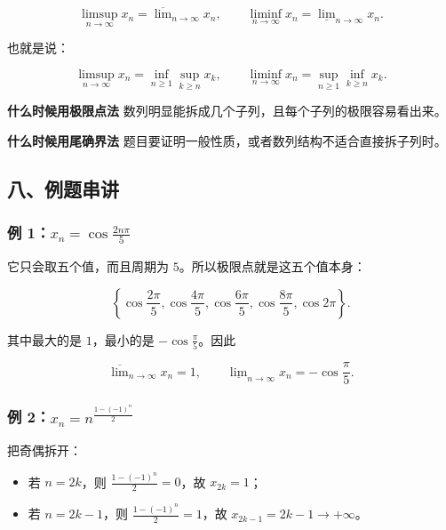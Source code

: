 \[
      \limsup_{n\to\infty}x_n=\overline{\lim}_{n\to\infty}x_n,
      \qquad
      \liminf_{n\to\infty}x_n=\underline{\lim}_{n\to\infty}x_n.
    \]

也就是说：

\[
      \limsup_{n\to\infty}x_n
      =
      \inf_{n\ge1}\sup_{k\ge n}x_k,
      \qquad
      \liminf_{n\to\infty}x_n
      =
      \sup_{n\ge1}\inf_{k\ge n}x_k.
    \]

\begin{conceptbox}
\textbf{什么时候用极限点法}
数列明显能拆成几个子列，且每个子列的极限容易看出来。
\end{conceptbox}

\begin{conceptbox}
\textbf{什么时候用尾确界法}
题目要证明一般性质，或者数列结构不适合直接拆子列时。
\end{conceptbox}

\subsection*{八、例题串讲}

\subsubsection*{例 1：\(\displaystyle x_n=\cos\frac{2n\pi}{5}\)}

它只会取五个值，而且周期为 \(5\)。所以极限点就是这五个值本身：

\[
      \left\{\cos\frac{2\pi}{5},\cos\frac{4\pi}{5},\cos\frac{6\pi}{5},\cos\frac{8\pi}{5},\cos 2\pi\right\}.
    \]

其中最大的是 \(1\)，最小的是 \(-\cos\frac{\pi}{5}\)。因此

\[
      \overline{\lim}_{n\to\infty}x_n=1,
      \qquad
      \underline{\lim}_{n\to\infty}x_n=-\cos\frac{\pi}{5}.
    \]

\subsubsection*{例 2：\(\displaystyle x_n=n^{\frac{1-(-1)^n}{2}}\)}

把奇偶拆开：

\begin{itemize}
 \item 若 \(n=2k\)，则 \(\frac{1-(-1)^n}{2}=0\)，故 \(x_{2k}=1\)；
 \item 若 \(n=2k-1\)，则 \(\frac{1-(-1)^n}{2}=1\)，故 \(x_{2k-1}=2k-1\to+\infty\)。
 \end{itemize}

